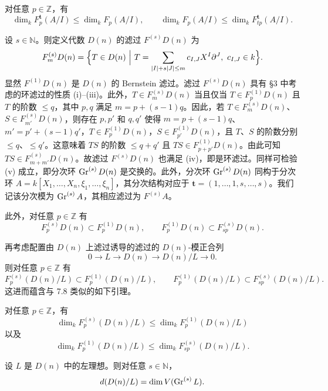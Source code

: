 \begin{lemma}
对任意 $p\in\mathbb{Z}$，有
$$\dim_k F^{\mathbf{t}}_p(A/I)\le\dim_k F_p(A/I),\qquad \dim_k F_p(A/I)\le\dim_k F^{\mathbf{t}}_{tp}(A/I).$$
\end{lemma}

设 $s\in\mathbb{N}$。则定义代数 $D(n)$ 的滤过 $F^{(s)}D(n)$ 为
$$F^{(s)}_m D(n)=\Bigl\{T\in D(n)\ \Big|\ T=\sum_{|I|+s|J|\le m}c_{I,J}X^I\partial^J,\ c_{I,J}\in k\Bigr\}.$$
显然 $F^{(1)}D(n)$ 是 $D(n)$ 的 Bernstein 滤过。滤过 $F^{(s)}D(n)$ 具有 §3 中考虑的环滤过的性质 (i)--(iii)。此外，$T\in F^{(s)}_m D(n)$ 当且仅当 $T\in F^{(1)}_p D(n)$ 且 $T$ 的阶数 $\le q$，其中 $p,q$ 满足 $m=p+(s-1)q$。因此，若 $T\in F^{(s)}_m D(n)$、$S\in F^{(s)}_{m'}D(n)$，则存在 $p,p'$ 和 $q,q'$ 使得 $m=p+(s-1)q$、$m'=p'+(s-1)q'$，$T\in F^{(1)}_p D(n)$，$S\in F^{(1)}_{p'}D(n)$，且 $T$、$S$ 的阶数分别 $\le q$、$\le q'$。这意味着 $TS$ 的阶数 $\le q+q'$ 且 $TS\in F^{(1)}_{p+p'}D(n)$。由此可知 $TS\in F^{(s)}_{m+m'}D(n)$。故滤过 $F^{(s)}D(n)$ 也满足 (iv)，即是环滤过。同样可检验 (v) 成立，即分次环 $\operatorname{Gr}^{(s)}D(n)$ 是交换的。此外，分次环 $\operatorname{Gr}^{(s)}D(n)$ 同构于分次环 $A=k[X_1,\dots,X_n,\xi_1,\dots,\xi_n]$，其分次结构对应于 $\mathbf{t}=(1,\dots,1,s,\dots,s)$。我们记该分次模为 $\operatorname{Gr}^{(s)}A$，其相应滤过为 $F^{(s)}A$。

此外，对任意 $p\in\mathbb{Z}$ 有
$$F^{(s)}_p D(n)\subset F^{(1)}_p D(n),\qquad F^{(1)}_p D(n)\subset F^{(s)}_{sp}D(n).$$

再考虑配置由 $D(n)$ 上滤过诱导的滤过的 $D(n)$-模正合列
$$0\longrightarrow L\longrightarrow D(n)\longrightarrow D(n)/L\longrightarrow 0.$$
则对任意 $p\in\mathbb{Z}$ 有
$$F^{(s)}_p(D(n)/L)\subset F^{(1)}_p(D(n)/L),\qquad F^{(1)}_p(D(n)/L)\subset F^{(s)}_{sp}(D(n)/L).$$
这进而蕴含与 7.8 类似的如下引理。

\begin{lemma}
对任意 $p\in\mathbb{Z}$，有
$$\dim_k F^{(s)}_p(D(n)/L)\le\dim_k F^{(1)}_p(D(n)/L)$$
以及
$$\dim_k F^{(1)}_p(D(n)/L)\le\dim_k F^{(s)}_{sp}(D(n)/L).$$
\end{lemma}

\begin{lemma}
设 $L$ 是 $D(n)$ 中的左理想。则对任意 $s\in\mathbb{N}$，
$$d(D(n)/L)=\dim V(\operatorname{Gr}^{(s)}L).$$
\end{lemma}

